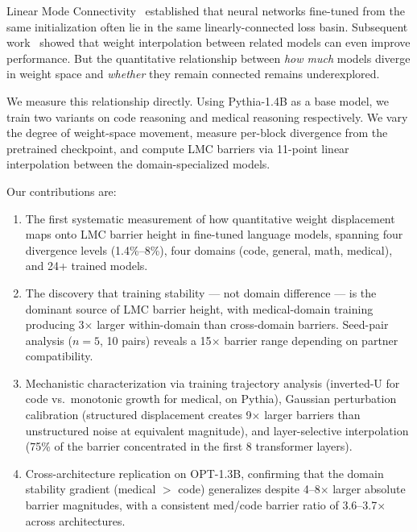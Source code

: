 \documentclass[11pt,a4paper]{article}
\begin{document}
Linear Mode Connectivity~\cite{frankle2020lmc} established that neural networks fine-tuned from the same initialization often lie in the same linearly-connected loss basin. Subsequent work~\cite{wortsman2022soups,yadav2023ties} showed that weight interpolation between related models can even improve performance. But the quantitative relationship between \emph{how much} models diverge in weight space and \emph{whether} they remain connected remains underexplored.

We measure this relationship directly. Using Pythia-1.4B as a base model, we train two variants on code reasoning and medical reasoning respectively. We vary the degree of weight-space movement, measure per-block divergence from the pretrained checkpoint, and compute LMC barriers via 11-point linear interpolation between the domain-specialized models.

Our contributions are:
\begin{enumerate}
    \item The first systematic measurement of how quantitative weight displacement maps onto LMC barrier height in fine-tuned language models, spanning four divergence levels (1.4\%--8\%), four domains (code, general, math, medical), and 24+ trained models.
    \item The discovery that training stability — not domain difference — is the dominant source of LMC barrier height, with medical-domain training producing 3$\times$ larger within-domain than cross-domain barriers. Seed-pair analysis ($n = 5$, 10 pairs) reveals a 15$\times$ barrier range depending on partner compatibility.
    \item Mechanistic characterization via training trajectory analysis (inverted-U for code vs.\ monotonic growth for medical, on Pythia), Gaussian perturbation calibration (structured displacement creates 9$\times$ larger barriers than unstructured noise at equivalent magnitude), and layer-selective interpolation (75\% of the barrier concentrated in the first 8 transformer layers).
    \item Cross-architecture replication on OPT-1.3B, confirming that the domain stability gradient (medical $>$ code) generalizes despite 4--8$\times$ larger absolute barrier magnitudes, with a consistent med/code barrier ratio of 3.6--3.7$\times$ across architectures.
\end{enumerate}

\end{document}
